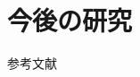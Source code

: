 \documentclass[dvipdfmx,notheorems,t]{beamer}
\begin{document}
\section{今後の研究}

\begin{frame}{参考文献}




\end{frame}
\end{document}

